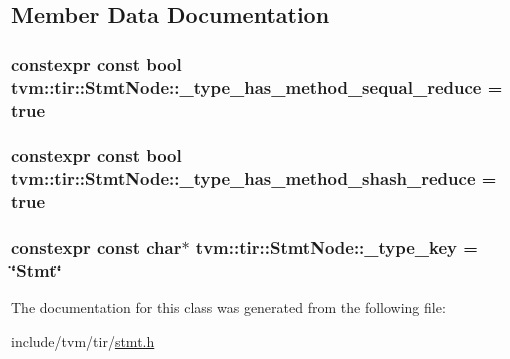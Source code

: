 \subsection{Member Data Documentation}
\subsubsection[{\texorpdfstring{\+\_\+type\+\_\+has\+\_\+method\+\_\+sequal\+\_\+reduce}{_type_has_method_sequal_reduce}}]{\setlength{\rightskip}{0pt plus 5cm}constexpr const bool tvm\+::tir\+::\+Stmt\+Node\+::\+\_\+type\+\_\+has\+\_\+method\+\_\+sequal\+\_\+reduce = true\hspace{0.3cm}{\ttfamily [static]}}\hypertarget{classtvm_1_1tir_1_1StmtNode_a463ce5a124a6c222706888122bb44865}{}\label{classtvm_1_1tir_1_1StmtNode_a463ce5a124a6c222706888122bb44865}
\subsubsection[{\texorpdfstring{\+\_\+type\+\_\+has\+\_\+method\+\_\+shash\+\_\+reduce}{_type_has_method_shash_reduce}}]{\setlength{\rightskip}{0pt plus 5cm}constexpr const bool tvm\+::tir\+::\+Stmt\+Node\+::\+\_\+type\+\_\+has\+\_\+method\+\_\+shash\+\_\+reduce = true\hspace{0.3cm}{\ttfamily [static]}}\hypertarget{classtvm_1_1tir_1_1StmtNode_ab7e026e32383e67e620719b025e00056}{}\label{classtvm_1_1tir_1_1StmtNode_ab7e026e32383e67e620719b025e00056}
\subsubsection[{\texorpdfstring{\+\_\+type\+\_\+key}{_type_key}}]{\setlength{\rightskip}{0pt plus 5cm}constexpr const char$\ast$ tvm\+::tir\+::\+Stmt\+Node\+::\+\_\+type\+\_\+key = \char`\"{}Stmt\char`\"{}\hspace{0.3cm}{\ttfamily [static]}}\hypertarget{classtvm_1_1tir_1_1StmtNode_af5d8bc86681742ef0bca9625751baccc}{}\label{classtvm_1_1tir_1_1StmtNode_af5d8bc86681742ef0bca9625751baccc}


The documentation for this class was generated from the following file\+:\begin{DoxyCompactItemize}
\item 
include/tvm/tir/\hyperlink{stmt_8h}{stmt.\+h}\end{DoxyCompactItemize}
